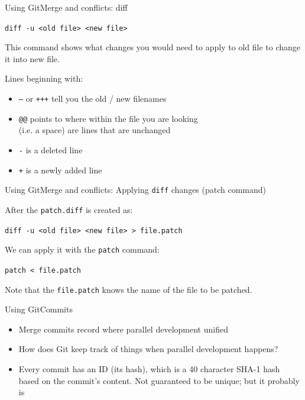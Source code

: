 \documentclass{beamer}
\begin{document}
\begin{frame}{Using Git}{Merge and conflicts: diff}

\texttt{diff -u <old file> <new file>} 

This command shows what changes you would need to apply to old file to change it into
new file.

Lines beginning with:
\begin{itemize}
 \item \texttt{--\-} or \texttt{+++} tell you the old / new filenames
 \item \texttt{@@} points to where within the file you are looking \\
       (i.e. a space) are lines that are unchanged
 \item \texttt{-} is a deleted line
 \item \texttt{+} is a newly added line
\end{itemize}

\end{frame}


\begin{frame}{Using Git}{Merge and conflicts: Applying \texttt{diff} changes (patch command)}

After the \texttt{patch.diff} is created as:

\texttt{diff -u <old file> <new file> > file.patch }

We can apply it with the \texttt{patch} command:

\texttt{patch < file.patch}

Note that the \texttt{file.patch} knows the name of the file to be patched.


\end{frame}



\begin{frame}{Using Git}{Commits}

\begin{itemize}
 \item Merge commits record where parallel development unified
 \item How does Git keep track of things when parallel development
happens?
\item Every commit has an ID (its hash), which is a 40 character SHA-1
hash based on the commit's content. Not guaranteed to be
unique; but it probably is
\end{itemize}

\end{frame}
\end{document}
